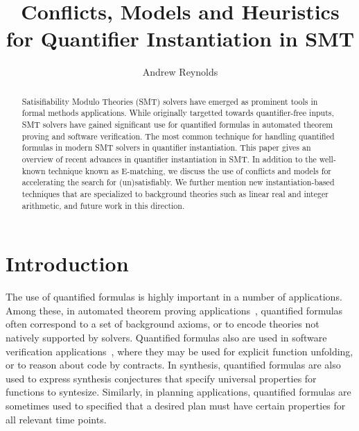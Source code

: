 \documentclass[oribibl]{llncs}
\begin{document}
\title{Conflicts, Models and Heuristics for Quantifier Instantiation in SMT}

\author {Andrew Reynolds}

\maketitle

\pagestyle{plain}

\begin{abstract}
Satisifiability Modulo Theories (SMT) solvers have
emerged as prominent tools in formal methods applications.
While originally targetted towards quantifier-free inputs,
SMT solvers have gained significant use for quantified formulas in automated
theorem proving and software verification.
The most common technique for handling quantified formulas in modern SMT solvers
in quantifier instantiation.
This paper gives an overview of recent advances in quantifier instantiation in SMT.
In addition to the well-known technique known as E-matching,
we discuss the use of conflicts and models for 
accelerating the search for (un)satisfiably.
We further mention new instantiation-based techniques
that are specialized to background theories such as linear real and integer arithmetic,
and future work in this direction.
\end{abstract}

\section{Introduction}



The use of quantified formulas is highly important in a number of applications.
Among these, in automated theorem proving applications~\cite{blanchette2013extending,bobot2011why3},
quantified formulas often correspond to a set of background axioms,
or to encode theories not natively supported by solvers.
Quantified formulas also are used in software verification applications~\cite{DBLP:conf/icse/Leino04,DBLP:conf/itp/ChapmanS14},
where they may be used for explicit function unfolding, or to reason about code by contracts.
In synthesis, quantified formulas are also used to express synthesis conjectures that 
specify universal properties for functions to syntesize.
Similarly, in planning applications, quantified formulas are sometimes used to specified
that a desired plan must have certain properties for all relevant time points.
\end{document}
